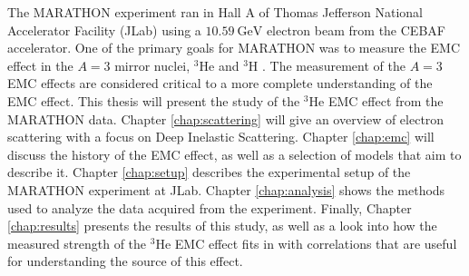 The MARATHON experiment ran in Hall A of Thomas Jefferson National Accelerator Facility (JLab) using a $10.59\ \text{GeV}$ electron beam from the CEBAF accelerator. One of the primary goals for MARATHON was to measure the EMC effect in the $A=3$ mirror nuclei, $^3$He and $^3$H \cite{proposal}. The measurement of the $A=3$ EMC effects are considered critical to a more complete understanding of the EMC effect. This thesis will present the study of the $^3$He EMC effect from the MARATHON data. Chapter \ref{chap:scattering} will give an overview of electron scattering with a focus on Deep Inelastic Scattering. Chapter \ref{chap:emc} will discuss the history of the EMC effect, as well as a selection of models that aim to describe it. Chapter \ref{chap:setup} describes the experimental setup of the MARATHON experiment at JLab. Chapter \ref{chap:analysis} shows the methods used to analyze the data acquired from the experiment. Finally, Chapter \ref{chap:results} presents the results of this study, as well as a look into how the measured strength of the $^3$He EMC effect fits in with correlations that are useful for understanding the source of this effect.